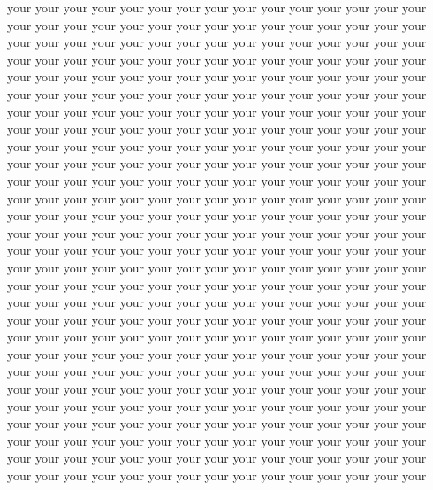 your your your your your your your your your your your your your your your your your your your your your your your your your your your your your your\\
your your your your your your your your your your your your your your your your your your your your your your your your your your your your your your\\
your your your your your your your your your your your your your your your your your your your your your your your your your your your your your your\\
your your your your your your your your your your your your your your your your your your your your your your your your your your your your your your\\
your your your your your your your your your your your your your your your your your your your your your your your your your your your your your your\\
your your your your your your your your your your your your your your your your your your your your your your your your your your your your your your\\
your your your your your your your your your your your your your your your your your your your your your your your your your your your your your your\\
your your your your your your your your your your your your your your your your your your your your your your your your your your your your your your\\
your your your your your your your your your your your your your your your your your your your your your your your your your your your your your your\\
your your your your your your your your your your your your your your your your your your your your your your your your your your your your your your\\
your your your your your your your your your your your your your your your your your your your your your your your your your your your your your your\\
your your your your your your your your your your your your your your your your your your your your your your your your your your your your your your\\
your your your your your your your your your your your your your your your your your your your your your your your your your your your your your your\\
your your your your your your your your your your your your your your your your your your your your your your your your your your your your your your\\
